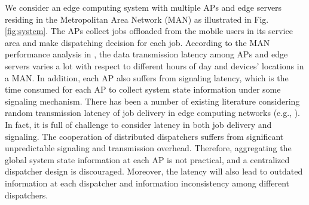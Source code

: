 We consider an edge computing system with multiple APs and edge servers residing in the Metropolitan Area Network (MAN) as illustrated in Fig.\ref{fig:system}.
The APs collect jobs offloaded from the mobile users in its service area and make dispatching decision for each job. According to the MAN performance analysis in \cite{MAN-LATENCY}, the data transmission latency {among APs and edge servers} varies a lot with respect to different hours of day and devices' locations in a MAN. {In addition, each AP also suffers from signaling latency, which is the time consumed for each AP to collect system state information under some signaling mechanism.}
There has been a number of existing literature considering random transmission latency of job delivery in edge computing networks (e.g., \cite{latency-EDGE19,MOBIHOC19-ZhouZ,IOTJ18-FanQ,TOC19-LiuC,JSAC19-AlameddineHA}). 
In fact, it is full of challenge to consider latency in {both job delivery and} signaling. The cooperation of distributed dispatchers suffers from significant unpredictable signaling and transmission overhead. Therefore, aggregating the global system state information at each AP is not practical, and a centralized dispatcher design is discouraged. Moreover, the latency will also lead to outdated information at each dispatcher and information inconsistency among different dispatchers.

